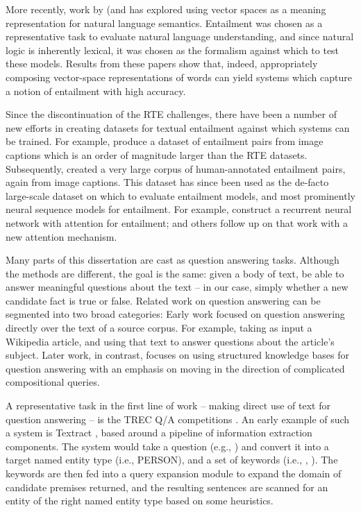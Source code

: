 More recently, work by 
  (and  has explored using vector spaces
  as a meaning representation for natural language semantics.
Entailment was chosen as a representative task to evaluate natural language
  understanding, and since natural logic is inherently lexical, it was chosen
  as the formalism against which to test these models.
Results from these papers show that, indeed, appropriately composing
  vector-space representations of words can yield systems which capture a
  notion of entailment with high accuracy.

Since the discontinuation of the RTE challenges, there have been a number of
  new efforts in creating datasets for textual entailment against which
  systems can be trained.
For example,  produce a dataset of entailment
  pairs from image captions which is an order of magnitude larger than the RTE
  datasets.
Subsequently,  created a very large corpus
  of human-annotated entailment pairs, again from image captions.
This dataset has since been used as the de-facto large-scale dataset on which
  to evaluate entailment models, and most prominently neural sequence models for
  entailment.
For example,  construct a recurrent neural network
  with attention for entailment;  and others
  follow up on that work with a new attention mechanism.



%
%
Many parts of this dissertation are cast as question answering tasks.
Although the methods are different, the goal is the same: given a body of text,
  be able to answer meaningful questions about the text -- in our case, simply
  whether a new candidate fact is true or false.
Related work on question answering can be segmented into two broad categories:
Early work focused on question answering directly over the text of a
  source corpus.
For example, taking as input a Wikipedia article, and using that text to answer
  questions about the article's subject.
Later work, in contrast, focuses on using structured knowledge bases for question
  answering with an emphasis on moving in the direction of 
  complicated compositional queries.

A representative task in the first line of work -- making direct use of text
  for question answering -- is the TREC Q/A competitions 
  \cite{key:2001voorhees-trec,key:2006voorhees-trec,key:2007dang-trec,key:2008voorhees-trec}.
An early example of such a system is Textract \cite{key:1999srihari-trec}, based around 
  a pipeline of information extraction components.
The system would take a question (e.g., )
  and convert it into a target named entity type (i.e., PERSON), and a set of keywords
  (i.e., , ).
The keywords are then fed into a query expansion module to expand the domain of candidate
  premises returned, and the resulting sentences are scanned for an entity of the right
  named entity type based on some heuristics.

